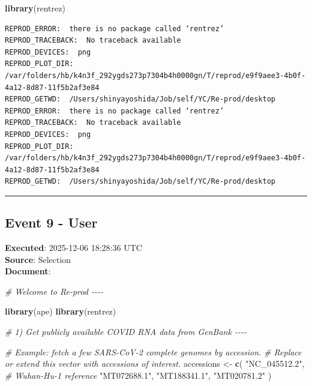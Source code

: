 \documentclass[
  11pt,
]{article}
\newenvironment{Shaded}{\begin{snugshade}}{\end{snugshade}}
\newcommand{\CommentTok}[1]{\textcolor[rgb]{0.56,0.35,0.01}{\textit{#1}}}
\newcommand{\FunctionTok}[1]{\textcolor[rgb]{0.13,0.29,0.53}{\textbf{#1}}}
\newcommand{\NormalTok}[1]{#1}
\newcommand{\OtherTok}[1]{\textcolor[rgb]{0.56,0.35,0.01}{#1}}
\newcommand{\StringTok}[1]{\textcolor[rgb]{0.31,0.60,0.02}{#1}}
\newenvironment{rpoutput}{\vspace{0.5em}\begin{snugshade}}{\end{snugshade}}
\begin{document}
\begin{Shaded}
\begin{Highlighting}[]
\FunctionTok{library}\NormalTok{(rentrez)}
\end{Highlighting}
\end{Shaded}

\begin{rpoutput}

\begin{verbatim}
REPROD_ERROR:  there is no package called ‘rentrez’ 
REPROD_TRACEBACK:  No traceback available  
REPROD_DEVICES:  png 
REPROD_PLOT_DIR:  /var/folders/hb/k4n3f_292ygds273p7304b4h0000gn/T/reprod/e9f9aee3-4b0f-4a12-8d87-11f5b2af3e84 
REPROD_GETWD:  /Users/shinyayoshida/Job/self/YC/Re-prod/desktop 
REPROD_ERROR:  there is no package called ‘rentrez’ 
REPROD_TRACEBACK:  No traceback available  
REPROD_DEVICES:  png 
REPROD_PLOT_DIR:  /var/folders/hb/k4n3f_292ygds273p7304b4h0000gn/T/reprod/e9f9aee3-4b0f-4a12-8d87-11f5b2af3e84 
REPROD_GETWD:  /Users/shinyayoshida/Job/self/YC/Re-prod/desktop 
\end{verbatim}

\end{rpoutput}

\begin{center}\rule{0.5\linewidth}{0.5pt}\end{center}

\subsection{Event 9 - User}\label{event-9---user}

\textbf{Executed}: 2025-12-06 18:28:36 UTC\\
\textbf{Source}: Selection\\
\textbf{Document}:

\begin{Shaded}
\begin{Highlighting}[]
\CommentTok{\# Welcome to Re{-}prod {-}{-}{-}{-}}

\FunctionTok{library}\NormalTok{(ape)}
\FunctionTok{library}\NormalTok{(rentrez)}

\CommentTok{\# 1) Get publicly available COVID RNA data from GenBank {-}{-}{-}{-}}

\CommentTok{\# Example: fetch a few SARS{-}CoV{-}2 complete genomes by accession.}
\CommentTok{\# Replace or extend this vector with accessions of interest.}
\NormalTok{accessions }\OtherTok{\textless{}{-}} \FunctionTok{c}\NormalTok{(}
  \StringTok{"NC\_045512.2"}\NormalTok{, }\CommentTok{\# Wuhan{-}Hu{-}1 reference}
  \StringTok{"MT072688.1"}\NormalTok{,}
  \StringTok{"MT188341.1"}\NormalTok{,}
  \StringTok{"MT020781.2"}
\NormalTok{)}
\end{Highlighting}
\end{Shaded}
\end{document}
